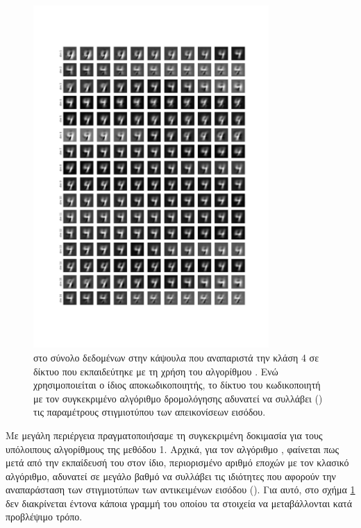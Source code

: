 \begin{figure}[h]
    \centering
    \includegraphics[width=0.8\textwidth]{images/chapter experiments/method 1/image 7/perturbations_19.png}
    \caption{ στο σύνολο δεδομένων  στην κάψουλα  που αναπαριστά την κλάση 4 σε δίκτυο που εκπαιδεύτηκε με τη χρήση του αλγορίθμου . Ενώ χρησιμοποιείται ο ίδιος αποκωδικοποιητής, το δίκτυο του κωδικοποιητή με τον συγκεκριμένο αλγόριθμο δρομολόγησης αδυνατεί να συλλάβει () τις παραμέτρους στιγμιοτύπου των απεικονίσεων εισόδου.}
    \label{fig:exp_method_1_special_perturb_2}
  \end{figure}
Με μεγάλη περιέργεια πραγματοποιήσαμε τη συγκεκριμένη δοκιμασία για τους υπόλοιπους αλγορίθμους της μεθόδου 1. Αρχικά, για τον αλγόριθμο , φαίνεται πως μετά από την εκπαίδευσή του στον ίδιο, περιορισμένο αριθμό εποχών με τον κλασικό αλγόριθμο, αδυνατεί σε μεγάλο βαθμό να συλλάβει τις ιδιότητες που αφορούν την αναπαράσταση των στιγμιοτύπων των αντικειμένων εισόδου (). Για αυτό, στο σχήμα \ref{fig:exp_method_1_special_perturb_2} δεν διακρίνεται έντονα κάποια γραμμή του οποίου τα στοιχεία να μεταβάλλονται κατά προβλέψιμο τρόπο.\par


